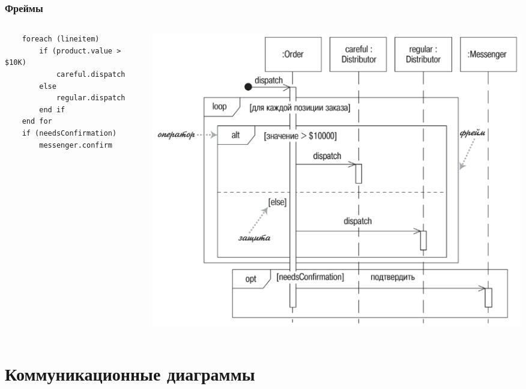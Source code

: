 \documentclass{../mcsslides}
\begin{document}
    \begin{frame}[fragile]
        \frametitle{Фреймы}
        \begin{columns}
            \begin{column}{0.5\textwidth}
                \begin{small}
                    \begin{verbatim}
    foreach (lineitem)
        if (product.value > $10K)
            careful.dispatch
        else
            regular.dispatch
        end if
    end for
    if (needsConfirmation) 
        messenger.confirm
                    \end{verbatim}
                \end{small}
            \end{column}
            \begin{column}{0.5\textwidth}
                \begin{center}
                    \includegraphics[width=\textwidth]{sequenceDiagramFrames.png}
                \end{center}
            \end{column}
        \end{columns}
    \end{frame}

    \section{Коммуникационные диаграммы}
\end{document}
